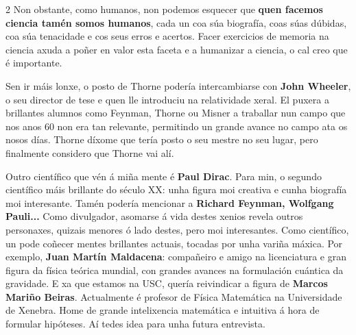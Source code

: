 \begin{multicols}{2}
Non obstante, como humanos, non podemos esquecer que \textbf{quen facemos ciencia 
tamén somos humanos}, cada un coa súa biografía, coas súas dúbidas, coa súa tenacidade 
e cos seus erros e acertos. Facer exercicios de memoria na ciencia axuda a poñer 
en valor esta faceta e a humanizar a ciencia, o cal creo que é importante.





Sen ir máis lonxe, o posto de Thorne podería intercambiarse con \textbf{John 
Wheeler}, o seu director de tese e quen lle introduciu na relatividade xeral. 
El puxera a brillantes alumnos como Feynman, Thorne ou Misner a traballar nun 
campo que nos anos 60 non era tan relevante, permitindo un grande avance no campo 
ata os nosos días. Thorne díxome que tería posto o seu mestre no seu lugar, pero 
finalmente considero que Thorne vai alí.

Outro científico que vén á miña mente é \textbf{Paul Dirac}. Para min, o segundo 
científico máis brillante do século XX: unha figura moi creativa e cunha biografía 
moi interesante. Tamén podería mencionar a \textbf{Richard Feynman, Wolfgang 
Pauli...} Como divulgador, asomarse á vida destes xenios revela outros personaxes, 
quizais menores ó lado destes, pero moi interesantes. Como científico, un pode 
coñecer mentes brillantes actuais, tocadas por unha variña máxica. Por exemplo, 
\textbf{Juan Martín Maldacena}: compañeiro e amigo na licenciatura e gran figura 
da física teórica mundial, con grandes avances na formulación cuántica da gravidade. 
E xa que estamos na USC, quería reivindicar a figura de \textbf{Marcos Mariño 
Beiras}. Actualmente é profesor de Física Matemática na Universidade de Xenebra. 
Home de grande intelixencia matemática e intuitiva á hora de formular hipóteses. 
Aí tedes idea para unha futura entrevista.






\end{multicols}
